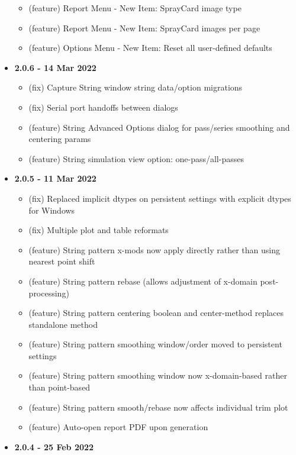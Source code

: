 \documentclass[10pt,letterpaper,titlepage]{article}
\begin{document}
\begin{itemize}
\begin{itemize}
            \item (feature) Report Menu - New Item: SprayCard image type
            \item (feature) Report Menu - New Item: SprayCard images per page
            \item (feature) Options Menu - New Item: Reset all user-defined defaults
        \end{itemize}
        \item \textbf{2.0.6 - 14 Mar 2022}
        \begin{itemize}
            \item (fix) Capture String window string data/option migrations
            \item (fix) Serial port handoffs between dialogs
            \item (feature) String Advanced Options dialog for pass/series smoothing and centering params
            \item (feature) String simulation view option: one-pass/all-passes
        \end{itemize}
        \item \textbf{2.0.5 - 11 Mar 2022}
        \begin{itemize}
            \item (fix) Replaced implicit dtypes on persistent settings with explicit dtypes for Windows
            \item (fix) Multiple plot and table reformats 
            \item (feature) String pattern x-mods now apply directly rather than using nearest point shift
            \item (feature) String pattern rebase (allows adjustment of x-domain post-processing)
            \item (feature) String pattern centering boolean and center-method replaces standalone method
            \item (feature) String pattern smoothing window/order moved to persistent settings
            \item (feature) String pattern smoothing window now x-domain-based rather than point-based 
            \item (feature) String pattern smooth/rebase now affects individual trim plot
            \item (feature) Auto-open report PDF upon generation
        \end{itemize}
        \item \textbf{2.0.4 - 25 Feb 2022}
        \begin{itemize}

\end{itemize}
\end{itemize}
\end{document}
